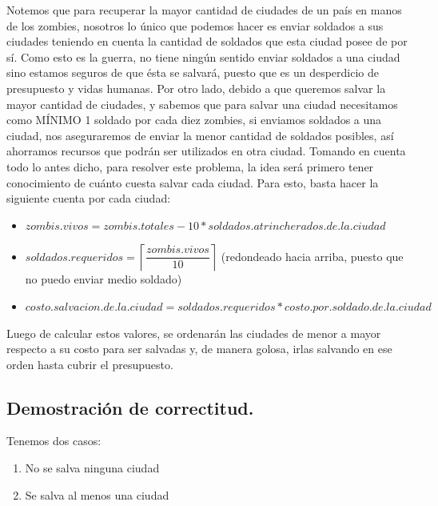 Notemos que para recuperar la mayor cantidad de ciudades de un país en manos de los zombies, nosotros lo único que podemos hacer es enviar soldados a sus ciudades teniendo en cuenta la cantidad de soldados que esta ciudad posee de por sí. Como esto es la guerra, no tiene ningún sentido enviar soldados a una ciudad sino estamos seguros de que ésta se salvará, puesto que es un desperdicio de presupuesto y vidas humanas. Por otro lado, debido a que queremos salvar la mayor cantidad de ciudades, y sabemos que para salvar una ciudad necesitamos como MÍNIMO 1 soldado por cada diez zombies, si enviamos soldados a una ciudad, nos aseguraremos de enviar la menor cantidad de soldados posibles, así ahorramos recursos que podrán ser utilizados en otra ciudad. Tomando en cuenta todo lo antes dicho, para resolver este problema, la idea será primero tener conocimiento de cuánto cuesta salvar cada ciudad. Para esto, basta hacer la siguiente cuenta por cada ciudad: %
\begin{itemize}
   \item $zombis.vivos = zombis.totales - 10 * soldados.atrincherados.de.la.ciudad$
   \item $soldados.requeridos = \left \lceil \dfrac{zombis.vivos}{10} \right \rceil$ (redondeado hacia arriba, puesto que no puedo enviar medio soldado)
   \item $costo.salvacion.de.la.ciudad = soldados.requeridos * costo.por.soldado.de.la.ciudad$
\end{itemize}

Luego de calcular estos valores, se ordenarán las ciudades de menor a mayor respecto a su costo para ser salvadas y, de manera golosa, irlas salvando en ese orden hasta cubrir el presupuesto.


\vspace*{0.6cm}

\subsection{Demostración de correctitud.}

\vspace*{0.3cm}

Tenemos dos casos:
\begin{enumerate}
	\item No se salva ninguna ciudad
	\item Se salva al menos una ciudad
\end{enumerate}

